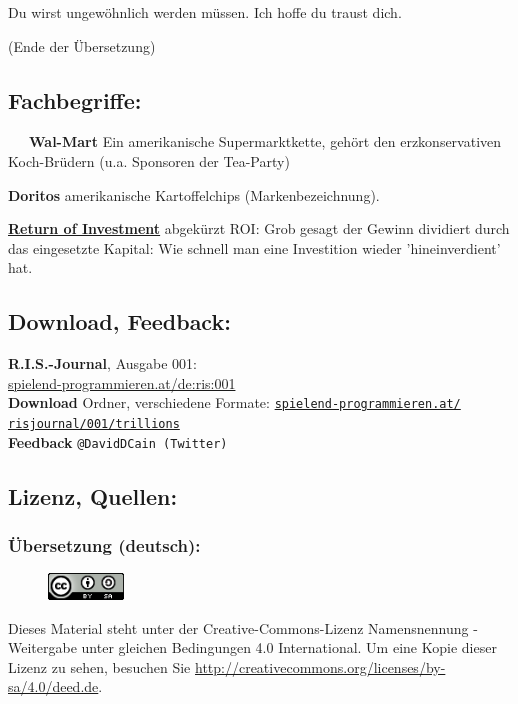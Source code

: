 Du wirst ungewöhnlich werden müssen. Ich hoffe du traust dich.


(Ende der Übersetzung)

\subsection*{Fachbegriffe:}

~~~\textbf{Wal-Mart} Ein amerikanische Supermarktkette, gehört den erzkonservativen Koch-Brüdern (u.a. Sponsoren der Tea-Party)

\textbf{Doritos} amerikanische Kartoffelchips (Markenbezeichnung). 

\href{https://de.wikipedia.org/wiki/Return_on_Investment}{\textbf{Return of Investment}} abgekürzt ROI: Grob gesagt der Gewinn dividiert durch das eingesetzte Kapital: Wie schnell man eine Investition wieder 'hineinverdient' hat. 

\subsection*{Download, Feedback:}
\textbf{R.I.S.-Journal}, Ausgabe 001: \\
\href{http://spielend-programmieren.at/de:ris:001}{spielend-programmieren.at/de:ris:001}\\
\textbf{Download} Ordner, verschiedene Formate: \href{http://spielend-programmieren.at/risjournal/001/trillions}{\texttt{spielend-programmieren.at/\\risjournal/001/trillions}} \\
\textbf{Feedback} \texttt{@DavidDCain (Twitter)} \\

\subsection*{Lizenz, Quellen:}

\subsubsection*{Übersetzung (deutsch):}

\begin{figure}
\includegraphics[width=2cm]{trillions/ccbysa88x31.png}
\end{figure}
Dieses Material steht unter der Creative-Commons-Lizenz Namensnennung - Weitergabe unter gleichen Bedingungen 4.0 International. Um eine Kopie dieser Lizenz zu sehen, besuchen Sie \url{http://creativecommons.org/licenses/by-sa/4.0/deed.de}.


